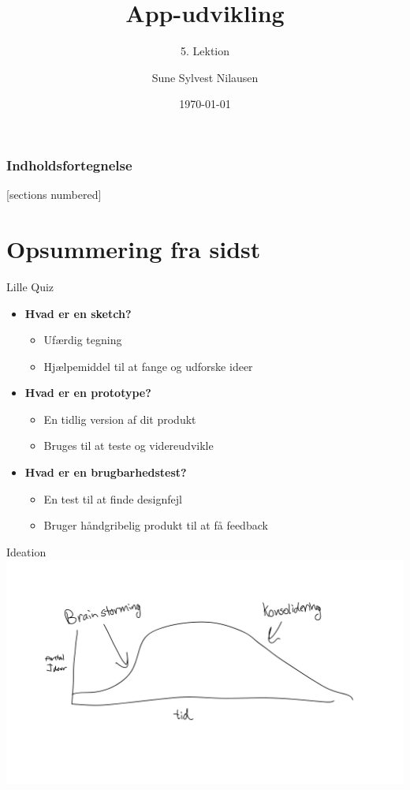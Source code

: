 \documentclass[10pt]{beamer}
\title{App-udvikling}
\subtitle{5. Lektion}
\date{\today}
\author{Sune Sylvest Nilausen}
\begin{document}

\maketitle

\begin{frame}
  \frametitle{Indholdsfortegnelse}
  [sections numbered]
  \tableofcontents[hideallsubsections]
\end{frame}

\section{Opsummering fra sidst}
\begin{frame}{Lille Quiz}
	\begin{itemize}
		\item \textbf{Hvad er en sketch?}
		\pause
		\begin{itemize}
			\item Ufærdig tegning
			\item Hjælpemiddel til at fange og udforske ideer
		\end{itemize}
		\item \textbf{Hvad er en prototype?}
		\pause
			\begin{itemize}
				\item En tidlig version af dit produkt
				\item Bruges til at teste og videreudvikle
			\end{itemize}
		\item \textbf{Hvad er en brugbarhedstest?}
		\pause
			\begin{itemize}
				\item En test til at finde designfejl
				\item Bruger håndgribelig produkt til at få feedback
			\end{itemize}
	\end{itemize}

\end{frame}

\begin{frame}{Ideation}
		\includegraphics[scale=0.18]{img/ideation.pdf}
\end{frame}
\end{document}
